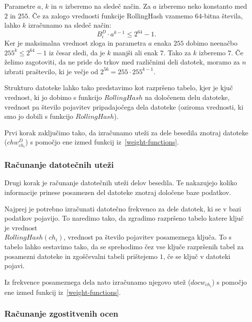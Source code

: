 \documentclass{acm_proc_article-sp}
\begin{document}
Parametre $a$, $k$ in $n$ izberemo na sledeč način. Za $a$ izberemo neko konstanto med $2$ in $255$. Če za zalogo vrednosti funkcije RollingHash vzamemo $64$-bitna števila, lahko $k$ izračunamo na sledeč način: \begin{displaymath}  B_{i}^{D} \cdot a^{k-1} \leq 2^{64}-1.\end{displaymath} Ker je maksimalna vrednost zloga in parametra $a$ enaka $255$ dobimo neenačbo $255^k \leq 2^{64}-1$ iz česar sledi, da je $k$ manjši ali enak $7$. Tako za $k$ izberemo $7$. Če želimo zagotoviti, da ne pride do trkov med različnimi deli datotek, moramo za $n$ izbrati praštevilo, ki je večje od $2^{56}=255\cdot 255^{k-1}$. 

Strukturo datoteke lahko tako predstavimo kot razpršeno tabelo, kjer je kjuč vrednost, ki jo dobimo s funkcijo $RollingHash$ na določenem delu datoteke, vrednost pa število pojavitev pripadajočega dela datoteke (oziroma vrednosti, ki smo jo dobili s funkcijo $RollingHash$).

Prvi korak zaključimo tako, da izračunamo uteži za dele besedila znotraj datoteke ($chw_{ch_i}^D$) s pomočjo ene izmed funkcij iz~\ref{weight-functions}. 

\subsubsection{Računanje datotečnih uteži}

Drugi korak je računanje datotečnih uteži delov besedila. Te nakazujejo koliko informacije prinese posamezen del datoteke znotraj določene baze podatkov. 

Najprej je potrebno izračunati datotečno frekvenco za dele datotek, ki se v bazi podatkov pojavijo. To naredimo tako, da zgradimo razpršeno tabelo katere ključ je vrednost \\ $RollingHash(ch_i)$, vrednost pa število pojavitev posameznega ključa. To s tabelo lahko sestavimo tako, da se sprehodimo čez vse ključe razpršenih tabel za posamezni datoteke in zgoščevalni tabeli prištejemo $1$, če se ključ v datoteki pojavi.

Iz frekvence posameznega dela nato izračunamo njegovo utež ($docw_{ch_i}$) s pomočjo ene izmed funkcij iz~\ref{weight-functions}.

\subsubsection{Računanje zgostitvenih ocen}
\end{document}
